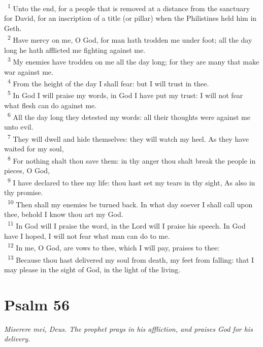 \documentclass[a5paper,12pt]{article}
\begin{document}
\begin{multicols*}{2}
~\textsuperscript{1} Unto the end, for a people that is removed at a distance from the sanctuary for David, for an inscription of a title (or pillar) when the Philistines held him in Geth.\\
~\textsuperscript{2} Have mercy on me, O God, for man hath trodden me under foot; all the day long he hath afflicted me fighting against me.\\
~\textsuperscript{3} My enemies have trodden on me all the day long; for they are many that make war against me.\\
~\textsuperscript{4} From the height of the day I shall fear: but I will trust in thee.\\
~\textsuperscript{5} In God I will praise my words, in God I have put my trust: I will not fear what flesh can do against me.\\
~\textsuperscript{6} All the day long they detested my words: all their thoughts were against me unto evil.\\
~\textsuperscript{7} They will dwell and hide themselves: they will watch my heel. As they have waited for my soul,\\
~\textsuperscript{8} For nothing shalt thou save them: in thy anger thou shalt break the people in pieces, O God,\\
~\textsuperscript{9} I have declared to thee my life: thou hast set my tears in thy sight, As also in thy promise.\\
~\textsuperscript{10} Then shall my enemies be turned back. In what day soever I shall call upon thee, behold I know thou art my God.\\
~\textsuperscript{11} In God will I praise the word, in the Lord will I praise his speech. In God have I hoped, I will not fear what man can do to me.\\
~\textsuperscript{12} In me, O God, are vows to thee, which I will pay, praises to thee:\\
~\textsuperscript{13} Because thou hast delivered my soul from death, my feet from falling: that I may please in the sight of God, in the light of the living.\\

\section{Psalm 56}
\label{sec:orgfbf9118}
\emph{Miserere mei, Deus. The prophet prays in his affliction, and praises God for his delivery.}\\


\end{multicols*}
\end{document}
